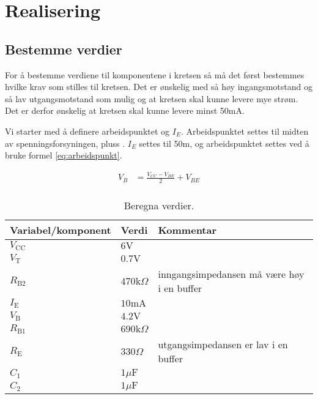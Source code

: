 \newpage
\section{Realisering}
\label{realiseringOgTest}

\subsection[short]{Bestemme verdier}
\label{bestemmeVerdier}

For å bestemme verdiene til komponentene i kretsen så må det først bestemmes hvilke krav som stilles til kretsen. Det er ønskelig med så høy ingangsmotstand og så lav utgangsmotstand som mulig og at kretsen skal kunne levere mye strøm. %
Det er derfor ønskelig at kretsen skal kunne levere minst 50mA.

Vi starter med å definere arbeidspunktet og $I_E$. Arbeidspunktet settes til midten av spenningsforsyningen, pluss . $I_E$ settes til 50m, og arbeidspunktet settes ved å bruke formel \ref{eq:arbeidspunkt}. 

\begin{equation}
\label{eq:arbeidspunkt}
\begin{split}
V_B &= \frac{V_{CC} - V_{BE}}{2} + V_{BE}\\
\end{split}
\end{equation}


\vspace{1cm}
\begin{table}[!h]
\centering %
\caption{Beregna verdier.}
\label{tab:vars}	%
\begin{tabular}{lll} %
\toprule %
\textbf{Variabel/komponent} & \textbf{Verdi} & \textbf{Kommentar} \\
\midrule
$V_{\text{CC}}$ & $6\text{V}$ & \\
$V_\text{T}$ & $0.7\text{V}$ & \\
$R_{\text{B}2}$ & $470\text{k}\Omega$ & inngangsimpedansen må være høy i en buffer \\
$I_\text{E}$ & $10\text{mA}$ & \\
$V_\text{B}$ & $4.2\text{V}$ & \\
$R_{\text{B}1}$ & $690\text{k}\Omega$ & \\
$R_\text{E}$ & $330\Omega$ & utgangsimpedansen er lav i en buffer \\
$C_1$ & $1\mu\text{F}$ & \\
$C_2$ & $1\mu\text{F}$ & \\
\bottomrule 
\end{tabular}
\end{table}
\vspace{1cm}